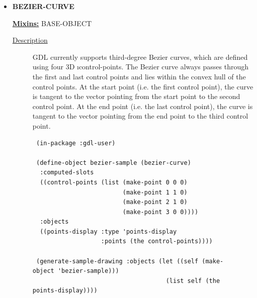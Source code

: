 \documentclass [11pt]{book}
\begin{document}
\begin{itemize}
\begin{description}
\end{description}







\item {}
\textbf{BEZIER-CURVE}


\textbf{
\underline{Mixins:}} BASE-OBJECT





\begin{description}

\item [
\underline{Description}]


GDL currently supports third-degree Bezier curves, which are 
defined using four 3D 
\i{control-points}. The Bezier curve always passes 
through the first and last control points and lies within the convex hull of the control 
points. At the start point (i.e. the first control point), the curve is tangent 
to the vector pointing from the start point to the second control point. 
At the end point (i.e. the last control point), the curve is tangent to the 
vector pointing from the end point to the third control point.



\end{description}




\begin{figure}
\begin{lrbox}{\boxedverb}
\begin{minipage}{\linewidth}
{\small

\begin{verbatim}
 (in-package :gdl-user)

 (define-object bezier-sample (bezier-curve)
  :computed-slots
  ((control-points (list (make-point 0 0 0)
                         (make-point 1 1 0)
                         (make-point 2 1 0)
                         (make-point 3 0 0))))
  :objects
  ((points-display :type 'points-display
                   :points (the control-points))))

 (generate-sample-drawing :objects (let ((self (make-object 'bezier-sample)))
                                     (list self (the points-display))))

\end{verbatim}}
\end{minipage}
\end{lrbox}
\fbox{\usebox{\boxedverb}}


\end{figure}
\end{itemize}
\end{document}
